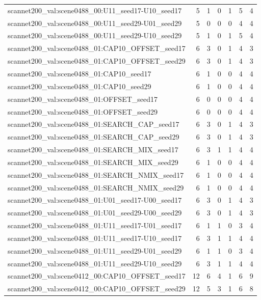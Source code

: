 \begin{table}[t]
\begin{tabular}{lrrrrrr}
scannet200\_val:scene0488\_00:U11\_seed17-U10\_seed17 & 5 & 1 & 0 & 1 & 5 & 4 \\
scannet200\_val:scene0488\_00:U11\_seed29-U01\_seed29 & 5 & 0 & 0 & 0 & 4 & 4 \\
scannet200\_val:scene0488\_00:U11\_seed29-U10\_seed29 & 5 & 1 & 0 & 1 & 5 & 4 \\
scannet200\_val:scene0488\_01:CAP10\_OFFSET\_seed17 & 6 & 3 & 0 & 1 & 4 & 3 \\
scannet200\_val:scene0488\_01:CAP10\_OFFSET\_seed29 & 6 & 3 & 0 & 1 & 4 & 3 \\
scannet200\_val:scene0488\_01:CAP10\_seed17 & 6 & 1 & 0 & 0 & 4 & 4 \\
scannet200\_val:scene0488\_01:CAP10\_seed29 & 6 & 1 & 0 & 0 & 4 & 4 \\
scannet200\_val:scene0488\_01:OFFSET\_seed17 & 6 & 0 & 0 & 0 & 4 & 4 \\
scannet200\_val:scene0488\_01:OFFSET\_seed29 & 6 & 0 & 0 & 0 & 4 & 4 \\
scannet200\_val:scene0488\_01:SEARCH\_CAP\_seed17 & 6 & 3 & 0 & 1 & 4 & 3 \\
scannet200\_val:scene0488\_01:SEARCH\_CAP\_seed29 & 6 & 3 & 0 & 1 & 4 & 3 \\
scannet200\_val:scene0488\_01:SEARCH\_MIX\_seed17 & 6 & 3 & 1 & 1 & 4 & 4 \\
scannet200\_val:scene0488\_01:SEARCH\_MIX\_seed29 & 6 & 1 & 0 & 0 & 4 & 4 \\
scannet200\_val:scene0488\_01:SEARCH\_NMIX\_seed17 & 6 & 1 & 0 & 0 & 4 & 4 \\
scannet200\_val:scene0488\_01:SEARCH\_NMIX\_seed29 & 6 & 1 & 0 & 0 & 4 & 4 \\
scannet200\_val:scene0488\_01:U01\_seed17-U00\_seed17 & 6 & 3 & 0 & 1 & 4 & 3 \\
scannet200\_val:scene0488\_01:U01\_seed29-U00\_seed29 & 6 & 3 & 0 & 1 & 4 & 3 \\
scannet200\_val:scene0488\_01:U11\_seed17-U01\_seed17 & 6 & 1 & 1 & 0 & 3 & 4 \\
scannet200\_val:scene0488\_01:U11\_seed17-U10\_seed17 & 6 & 3 & 1 & 1 & 4 & 4 \\
scannet200\_val:scene0488\_01:U11\_seed29-U01\_seed29 & 6 & 1 & 1 & 0 & 3 & 4 \\
scannet200\_val:scene0488\_01:U11\_seed29-U10\_seed29 & 6 & 3 & 1 & 1 & 4 & 4 \\
scannet200\_val:scene0412\_00:CAP10\_OFFSET\_seed17 & 12 & 6 & 4 & 1 & 6 & 9 \\
scannet200\_val:scene0412\_00:CAP10\_OFFSET\_seed29 & 12 & 5 & 3 & 1 & 6 & 8 \\

\end{tabular}
\end{table}
